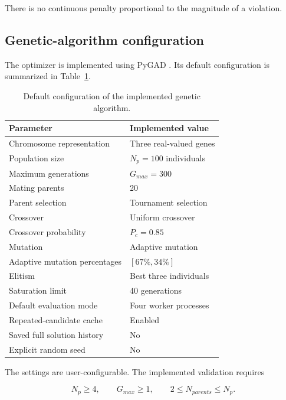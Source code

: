 There is no continuous penalty proportional to the magnitude of a violation.

\subsection{Genetic-algorithm configuration}

The optimizer is implemented using PyGAD \cite{PyGAD}. Its default configuration is summarized in
Table~\ref{tab:ga_configuration_updated}.

\begin{table}[htbp]
\centering
\caption{Default configuration of the implemented genetic algorithm.}
\label{tab:ga_configuration_updated}
\begin{tabular}{ll}
\toprule
Parameter & Implemented value \\
\midrule
Chromosome representation & Three real-valued genes \\
Population size & \(N_p=100\) individuals \\
Maximum generations & \(G_{max}=300\) \\
Mating parents & 20 \\
Parent selection & Tournament selection \\
Crossover & Uniform crossover \\
Crossover probability & \(P_c=0.85\) \\
Mutation & Adaptive mutation \\
Adaptive mutation percentages & \([67\%,34\%]\) \\
Elitism & Best three individuals \\
Saturation limit & 40 generations \\
Default evaluation mode & Four worker processes \\
Repeated-candidate cache & Enabled \\
Saved full solution history & No \\
Explicit random seed & No \\
\bottomrule
\end{tabular}
\end{table}

The settings are user-configurable. The implemented validation requires

\begin{equation}
N_p\geq4,
\qquad
G_{max}\geq1,
\qquad
2\leq N_{parents}\leq N_p.
\label{eq:minimum_ga_settings}
\end{equation}

